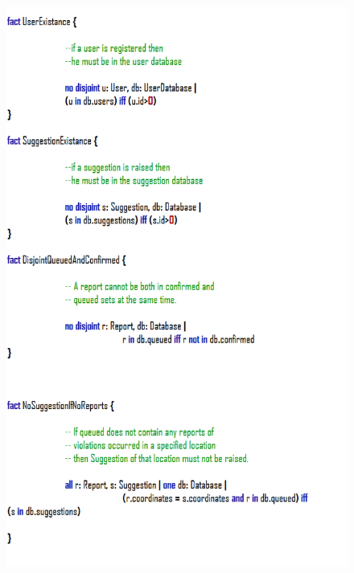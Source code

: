 \documentclass[12pt,a4paper]{article}
\begin{document}
				\begin{figure}[H]
				\centering
				\includegraphics[width=1\linewidth]{../assets/images/exports/user/Facts 2.png}
				\label{fig:facts2}
			\end{figure}
\end{document}
